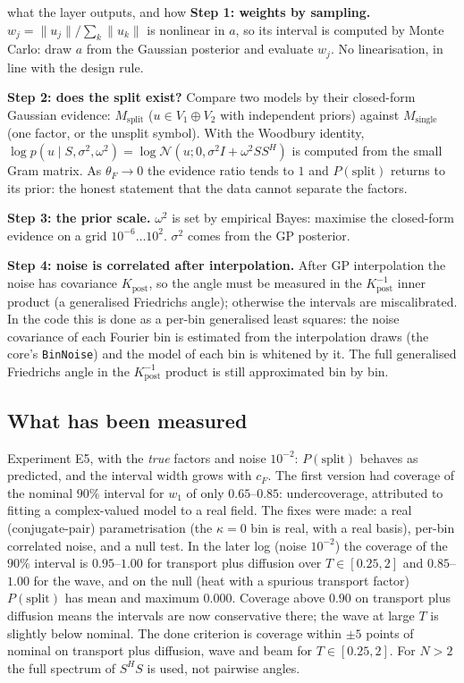 \begin{explained}{what the layer outputs, and how}
\textbf{Step 1: weights by sampling.} $w_j=\|u_j\|/\sum_k\|u_k\|$ is nonlinear in $a$, so its interval is computed by Monte Carlo: draw $a$ from the Gaussian posterior and evaluate $w_j$. No linearisation, in line with the design rule.

\medskip\textbf{Step 2: does the split exist?} Compare two models by their closed-form Gaussian evidence: $M_{\mathrm{split}}$ ($u\in V_1\oplus V_2$ with independent priors) against $M_{\mathrm{single}}$ (one factor, or the unsplit symbol). With the Woodbury identity, $\log p(u\mid S,\sigma^2,\omega^2)=\log\mathcal N(u;0,\sigma^2I+\omega^2SS^{H})$ is computed from the small Gram matrix. As $\theta_F\to0$ the evidence ratio tends to $1$ and $P(\text{split})$ returns to its prior: the honest statement that the data cannot separate the factors.

\medskip\textbf{Step 3: the prior scale.} $\omega^2$ is set by empirical Bayes: maximise the closed-form evidence on a grid $10^{-6}\ldots10^{2}$. $\sigma^2$ comes from the GP posterior.

\medskip\textbf{Step 4: noise is correlated after interpolation.} After GP interpolation the noise has covariance $K_{\mathrm{post}}$, so the angle must be measured in the $K_{\mathrm{post}}^{-1}$ inner product (a generalised Friedrichs angle); otherwise the intervals are miscalibrated. In the code this is done as a per-bin generalised least squares: the noise covariance of each Fourier bin is estimated from the interpolation draws (the core's \texttt{BinNoise}) and the model of each bin is whitened by it. The full generalised Friedrichs angle in the $K_{\mathrm{post}}^{-1}$ product is still approximated bin by bin.
\end{explained}

\subsection{What has been measured}
Experiment E5, with the \emph{true} factors and noise $10^{-2}$: $P(\text{split})$ behaves as predicted, and the interval width grows with $c_F$. The first version had coverage of the nominal $90\%$ interval for $w_1$ of only $0.65$--$0.85$: undercoverage, attributed to fitting a complex-valued model to a real field. The fixes were made: a real (conjugate-pair) parametrisation (the $\kappa=0$ bin is real, with a real basis), per-bin correlated noise, and a null test. In the later log (noise $10^{-2}$) the coverage of the $90\%$ interval is $0.95$--$1.00$ for transport plus diffusion over $T\in[0.25,2]$ and $0.85$--$1.00$ for the wave, and on the null (heat with a spurious transport factor) $P(\text{split})$ has mean and maximum $0.000$. Coverage above $0.90$ on transport plus diffusion means the intervals are now conservative there; the wave at large $T$ is slightly below nominal. The done criterion is coverage within $\pm5$ points of nominal on transport plus diffusion, wave and beam for $T\in[0.25,2]$. For $N>2$ the full spectrum of $S^{H}S$ is used, not pairwise angles.

